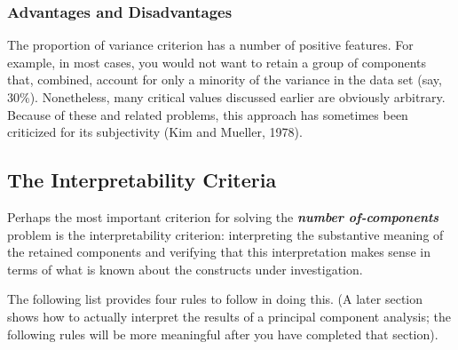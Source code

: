 \documentclass[a4paper,12pt]{article}
\begin{document}
\subsubsection{Advantages and Disadvantages}

The proportion of variance criterion has a number of positive features.  For example, in most
cases, you would not want to retain a group of components that, combined, account for only a
minority of the variance in the data set (say, $30\%$).  Nonetheless, many critical values discussed
earlier are obviously arbitrary.  Because of these and related problems, this approach has sometimes been
criticized for its subjectivity (Kim and Mueller, 1978).

\subsection{The Interpretability Criteria}

Perhaps the most important criterion for solving the \textbf{\emph{number of-components}} problem is the interpretability criterion:  interpreting the substantive meaning of the retained components and verifying that this interpretation makes sense in terms of what is known about the constructs under investigation.


The following list provides four rules to follow in doing this.  (A later section shows how to
actually interpret the results of a principal component analysis; the following rules will be more
meaningful after you have completed that section).
\end{document}
